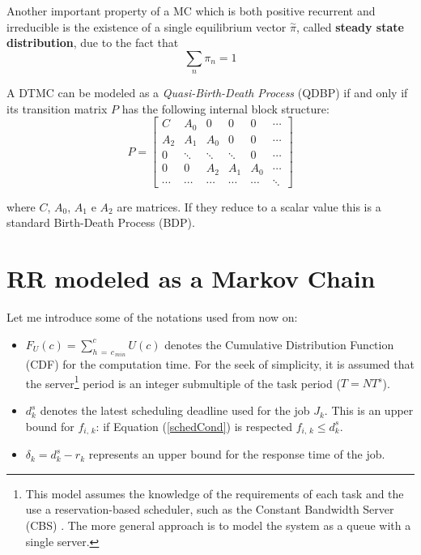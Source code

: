 Another important property of a MC which is both positive recurrent and irreducible is the existence of a single equilibrium vector \( \overset{\sim}{\pi} \), called \textbf{steady state distribution}, due to the fact that
\begin{equation*}
  \displaystyle\sum_{n} \pi_{n} = 1
\end{equation*}

A DTMC can be modeled as a \emph{Quasi-Birth-Death Process} (QDBP) \cite{nummethods} if and only if its transition matrix \( P \) has the following internal block structure:
\begin{equation*} \label{transitionmatrix}
  P = 
  \begin{bmatrix}
    C & A_{0} & 0 & 0 & 0 & \cdots \\
    A_{2} & A_{1} & A_{0} & 0 & 0 & \cdots \\
    0 & \ddots & \ddots & \ddots & 0 & \cdots \\
    0 & 0 & A_{2} & A_{1} & A_{0} & \cdots \\
    \cdots & \cdots & \cdots & \cdots & \cdots & \ddots
  \end{bmatrix}
\end{equation*}

where \( C \), \( A_{0} \), \( A_{1} \) e \( A_{2} \) are matrices. If they reduce to a scalar value this is a standard Birth-Death Process (BDP).

\section{RR modeled as a Markov Chain}
Let me introduce some of the notations used from now on:
\begin{itemize}
  \item \( F_{U}(c) = \displaystyle\sum_{h\,=\,c_{\,min}}^{c} U(c) \) denotes the Cumulative Distribution Function (CDF) for the computation time. For the seek of simplicity, it is assumed that the server\footnote{This model assumes the knowledge of the requirements of each task and the use a reservation-based scheduler, such as the Constant Bandwidth Server (CBS) \cite{pipelines}. The more general approach is to model the system as a queue with a single server.} period is an integer submultiple of the task period (\( T = NT^{s} \)).
  \item \( d_{k}^{s} \) denotes the latest scheduling deadline used for the job \( J_{k} \). This is an upper bound for \( f_{i,\,k} \): if Equation (\ref{schedCond}) is respected \( f_{i,\,k} \leq d_{k}^{s} \).
  \item \( \delta_{k} = d_{k}^{s} - r_{k} \) represents an upper bound for the response time of the job.
\end{itemize}

